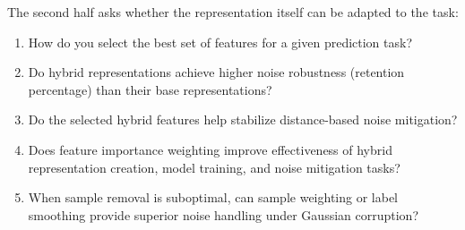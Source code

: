 The second half asks whether the representation itself can be adapted to the task:
\begin{enumerate}
    \item How do you select the best set of features for a given prediction task?
    \item Do hybrid representations achieve higher noise robustness (retention percentage) than their base representations?
    \item Do the selected hybrid features help stabilize distance-based noise mitigation?
    \item Does feature importance weighting improve effectiveness of hybrid representation creation, model training, and noise mitigation tasks?
    \item When sample removal is suboptimal, can sample weighting or label smoothing provide superior noise handling under Gaussian corruption?
\end{enumerate}

